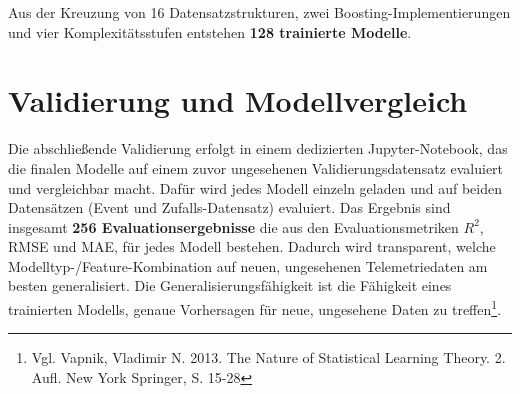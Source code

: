 Aus der Kreuzung von 16 Datensatzstrukturen, zwei Boosting-Implementierungen und vier Komplexitätsstufen entstehen \textbf{128 trainierte Modelle}.







\section{Validierung und Modellvergleich}
\label{sec:validierung_modellvergleich}

Die abschließende Validierung erfolgt in einem dedizierten Jupyter-Notebook, das die finalen Modelle auf einem zuvor ungesehenen Validierungsdatensatz evaluiert und vergleichbar macht.
Dafür wird jedes Modell einzeln geladen und auf beiden Datensätzen (Event und Zufalls-Datensatz) evaluiert. Das Ergebnis sind insgesamt \textbf{256 Evaluationsergebnisse} die aus den Evaluationsmetriken $R^2$, RMSE und MAE, für jedes Modell bestehen.
\noindent
Dadurch wird transparent, welche Modelltyp-/Feature-Kombination auf neuen, ungesehenen Telemetriedaten am besten generalisiert. Die Generalisierungsfähigkeit ist die Fähigkeit eines trainierten Modells, genaue Vorhersagen für neue, ungesehene Daten zu treffen\footnote{Vgl. Vapnik, Vladimir N. 2013. The Nature of Statistical Learning Theory. 2. Aufl. New York Springer, S. 15-28}.
